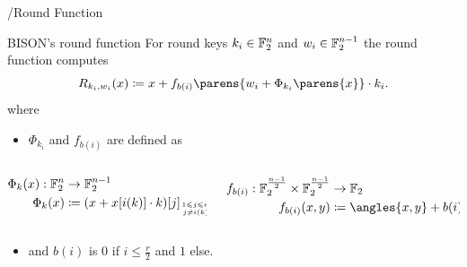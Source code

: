 \begin{frame}{\bison/}{Round Function}
    \begin{block}{BISON's round function}
        \centering
        \vspace{0.5\baselineskip}
        For round keys $k_i\in \mathbb{F}_2^n$ and $w_i\in \mathbb{F}_2^{n-1}$ the round function computes
        \begin{equation*}
            R_{k_i, w_i}(x) \coloneqq x + f_{b(i)} \parens{w_i + \Phi_{k_i}\parens{x}} \cdot k_i.
        \end{equation*}
        \flushleft
        where
        \begin{itemize}
            \item $\Phi_{k_i}$ and $f_{b(i)}$ are defined as
        \end{itemize}
        \vspace{-10pt}
        \begin{columns}
            \begin{column}{0.49\textwidth}
                \begin{align*}
                    \Phi_k(x) : \F_2^n &\to \F_2^{n-1} \\
                    \Phi_k(x) &\coloneqq (x + x[i(k)] \cdot k)[j]_{\tower{1 \leqslant j \leqslant n}{j \neq i(k)}}
                \end{align*}
            \end{column}
            \begin{column}{0.49\textwidth}
                \begin{align*}
                    f_{b(i)} : \F_2^{\frac{n-1}{2}}\times \F_2^{\frac{n-1}{2}} &\to \F_2 \\
                    f_{b(i)}(x,y) &\coloneqq \angles{x,y} + b(i),
                \end{align*}
            \end{column}
        \end{columns}
        \begin{itemize}
            \item and $b(i)$ is $0$ if $i \leqslant \frac{r}{2}$ and $1$ else.
        \end{itemize}
        \vspace{-0.25\baselineskip}
    \end{block}
\end{frame}

